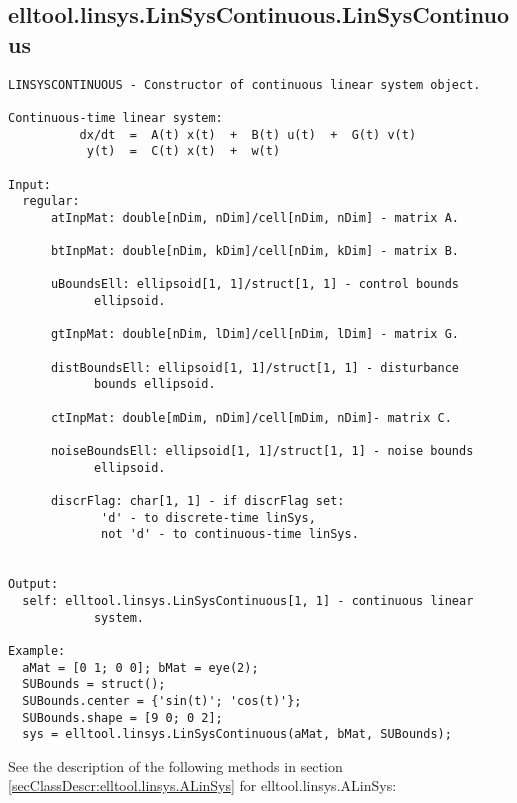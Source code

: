 \subsection{\texorpdfstring{elltool.linsys.LinSysContinuous.LinSysContinuous}{LinSysContinuous}}\label{method:elltool.linsys.LinSysContinuous.LinSysContinuous}
\begin{verbatim}
LINSYSCONTINUOUS - Constructor of continuous linear system object.

Continuous-time linear system:
          dx/dt  =  A(t) x(t)  +  B(t) u(t)  +  G(t) v(t)
           y(t)  =  C(t) x(t)  +  w(t)

Input:
  regular:
      atInpMat: double[nDim, nDim]/cell[nDim, nDim] - matrix A.

      btInpMat: double[nDim, kDim]/cell[nDim, kDim] - matrix B.

      uBoundsEll: ellipsoid[1, 1]/struct[1, 1] - control bounds
            ellipsoid.

      gtInpMat: double[nDim, lDim]/cell[nDim, lDim] - matrix G.

      distBoundsEll: ellipsoid[1, 1]/struct[1, 1] - disturbance
            bounds ellipsoid.

      ctInpMat: double[mDim, nDim]/cell[mDim, nDim]- matrix C.

      noiseBoundsEll: ellipsoid[1, 1]/struct[1, 1] - noise bounds
            ellipsoid.

      discrFlag: char[1, 1] - if discrFlag set:
             'd' - to discrete-time linSys,
             not 'd' - to continuous-time linSys.


Output:
  self: elltool.linsys.LinSysContinuous[1, 1] - continuous linear
            system.

Example:
  aMat = [0 1; 0 0]; bMat = eye(2);
  SUBounds = struct();
  SUBounds.center = {'sin(t)'; 'cos(t)'};
  SUBounds.shape = [9 0; 0 2];
  sys = elltool.linsys.LinSysContinuous(aMat, bMat, SUBounds);
\end{verbatim}


See the description of the following methods in section \ref{secClassDescr:elltool.linsys.ALinSys}
 for elltool.linsys.ALinSys:

